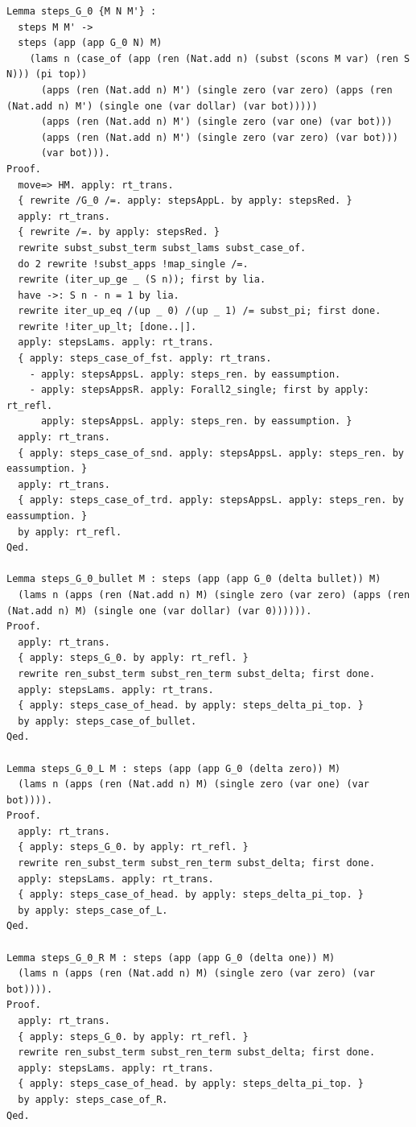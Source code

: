 \begin{lstlisting}
Lemma steps_G_0 {M N M'} :
  steps M M' ->
  steps (app (app G_0 N) M)
    (lams n (case_of (app (ren (Nat.add n) (subst (scons M var) (ren S N))) (pi top))
      (apps (ren (Nat.add n) M') (single zero (var zero) (apps (ren (Nat.add n) M') (single one (var dollar) (var bot)))))
      (apps (ren (Nat.add n) M') (single zero (var one) (var bot)))
      (apps (ren (Nat.add n) M') (single zero (var zero) (var bot)))
      (var bot))).
Proof.
  move=> HM. apply: rt_trans.
  { rewrite /G_0 /=. apply: stepsAppL. by apply: stepsRed. }
  apply: rt_trans.
  { rewrite /=. by apply: stepsRed. }
  rewrite subst_subst_term subst_lams subst_case_of.
  do 2 rewrite !subst_apps !map_single /=.
  rewrite (iter_up_ge _ (S n)); first by lia.
  have ->: S n - n = 1 by lia.
  rewrite iter_up_eq /(up _ 0) /(up _ 1) /= subst_pi; first done.
  rewrite !iter_up_lt; [done..|].
  apply: stepsLams. apply: rt_trans.
  { apply: steps_case_of_fst. apply: rt_trans.
    - apply: stepsAppsL. apply: steps_ren. by eassumption.
    - apply: stepsAppsR. apply: Forall2_single; first by apply: rt_refl.
      apply: stepsAppsL. apply: steps_ren. by eassumption. }
  apply: rt_trans.
  { apply: steps_case_of_snd. apply: stepsAppsL. apply: steps_ren. by eassumption. }
  apply: rt_trans.
  { apply: steps_case_of_trd. apply: stepsAppsL. apply: steps_ren. by eassumption. }
  by apply: rt_refl.
Qed.

Lemma steps_G_0_bullet M : steps (app (app G_0 (delta bullet)) M)
  (lams n (apps (ren (Nat.add n) M) (single zero (var zero) (apps (ren (Nat.add n) M) (single one (var dollar) (var 0)))))).
Proof.
  apply: rt_trans.
  { apply: steps_G_0. by apply: rt_refl. }
  rewrite ren_subst_term subst_ren_term subst_delta; first done.
  apply: stepsLams. apply: rt_trans.
  { apply: steps_case_of_head. by apply: steps_delta_pi_top. }
  by apply: steps_case_of_bullet.
Qed.

Lemma steps_G_0_L M : steps (app (app G_0 (delta zero)) M)
  (lams n (apps (ren (Nat.add n) M) (single zero (var one) (var bot)))).
Proof.
  apply: rt_trans.
  { apply: steps_G_0. by apply: rt_refl. }
  rewrite ren_subst_term subst_ren_term subst_delta; first done.
  apply: stepsLams. apply: rt_trans.
  { apply: steps_case_of_head. by apply: steps_delta_pi_top. }
  by apply: steps_case_of_L.
Qed.

Lemma steps_G_0_R M : steps (app (app G_0 (delta one)) M)
  (lams n (apps (ren (Nat.add n) M) (single zero (var zero) (var bot)))).
Proof.
  apply: rt_trans.
  { apply: steps_G_0. by apply: rt_refl. }
  rewrite ren_subst_term subst_ren_term subst_delta; first done.
  apply: stepsLams. apply: rt_trans.
  { apply: steps_case_of_head. by apply: steps_delta_pi_top. }
  by apply: steps_case_of_R.
Qed.


\end{lstlisting}
